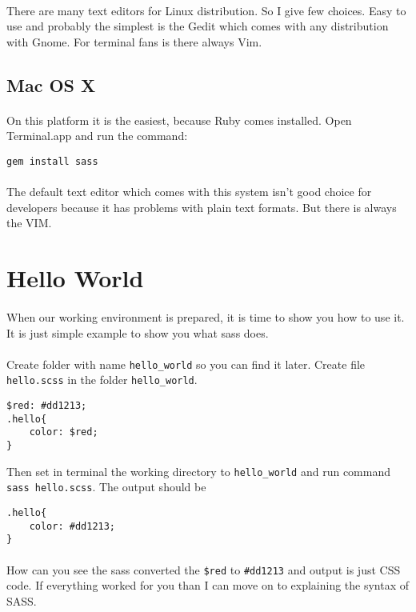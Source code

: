 \paragraph{}
There are many text editors for Linux distribution. So I give few choices. Easy to use and probably the simplest is the Gedit which comes with any distribution with Gnome. For terminal fans is there always Vim.

\subsection{Mac OS X}
\paragraph{}
On this platform it is the easiest, because Ruby comes installed. Open Terminal.app and run the command:
\begin{verbatim}
gem install sass
\end{verbatim}
\paragraph{}
The default text editor which comes with this system isn't good choice for developers because it has problems with plain text formats. But there is always the VIM.

\section{Hello World}
\paragraph{}
When our working environment is prepared, it is time to show you how to use it. It is just simple example to show you what sass does.
\paragraph{}
Create folder with name \texttt{hello\_world} so you can find it later. Create file \texttt{hello.scss} in the folder \texttt{hello\_world}.
\begin{verbatim}
$red: #dd1213;
.hello{
    color: $red;
}
\end{verbatim}

Then set in terminal the working directory to \texttt{hello\_world} and run command \texttt{sass hello.scss}. The output should be

\begin{verbatim}
.hello{
    color: #dd1213;
}
\end{verbatim}
\paragraph{}
How can you see the sass converted the \texttt{\$red} to \texttt{\#dd1213} and output is just CSS code. If everything worked for you than I can move on to explaining the syntax of SASS.